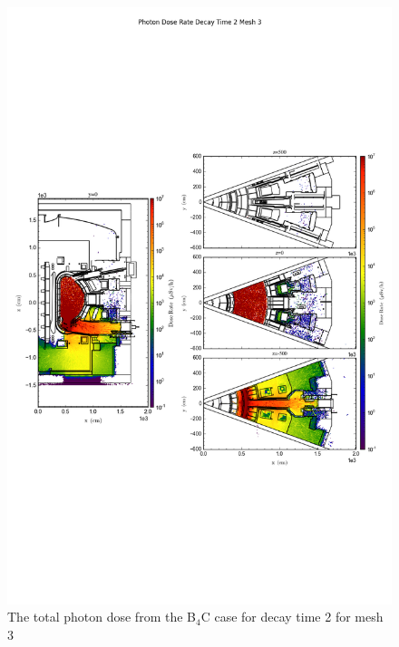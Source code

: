 \documentclass[12pt]{article}
\begin{document}
\begin{figure}[ht!]
\centering
\includegraphics[trim={0cm 9cm 0cm 10cm},clip,scale=0.75]{../plots/final_model/Photon_Dose_Rate_Decay_Time_2_Mesh_3.png}
\caption{The total photon dose from the B$_4$C case for decay time 2 for mesh 3}
\label{fig:ct_photons_dc2_no4bc_m3_flux}
\end{figure}
\newpage
\clearpage
\end{document}
